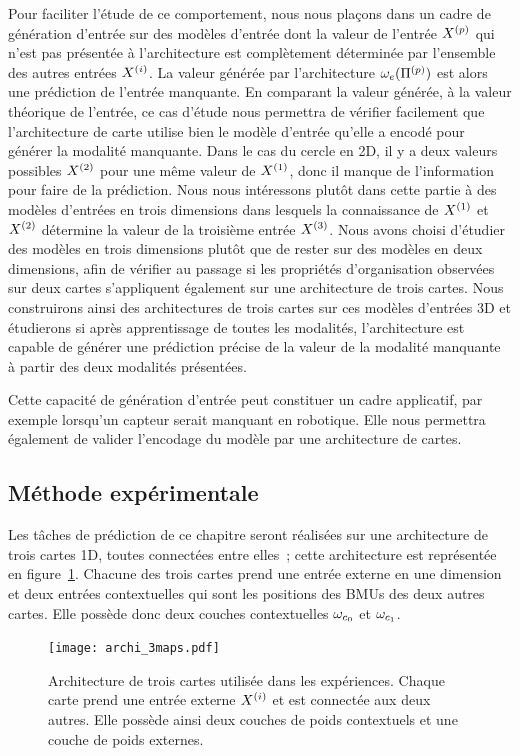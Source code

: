 \documentclass[../main]{subfiles}
\begin{document}
Pour faciliter l'étude de ce comportement, nous nous plaçons dans un cadre de génération d'entrée sur des modèles d'entrée dont la valeur de l'entrée $X^{({p})}$ qui n'est pas présentée à l'architecture est complètement déterminée par l'ensemble des autres entrées $X^{({i})}$. La valeur générée par l'architecture $\omega_e(\Pi^{({p})})$ est alors une prédiction de l'entrée manquante.
En comparant la valeur générée, à la valeur théorique de l'entrée, ce cas d'étude nous permettra de vérifier facilement que l'architecture de carte utilise bien le modèle d'entrée qu'elle a encodé pour générer la modalité manquante.
Dans le cas du cercle en 2D, il y a deux valeurs possibles $X^{({2})}$ pour une même valeur de $X^{({1})}$, donc il manque de l'information pour faire de la prédiction.
Nous nous intéressons plutôt dans cette partie à des modèles d'entrées en trois dimensions dans lesquels la connaissance de $X^{({1})}$ et $X^{({2})}$ détermine la valeur de la troisième entrée $X^{({3})}$.
Nous avons choisi d'étudier des modèles en trois dimensions plutôt que de rester sur des modèles en deux dimensions, afin de vérifier au passage si les propriétés d'organisation observées sur deux cartes s'appliquent également sur une architecture de trois cartes.
Nous construirons ainsi des architectures de trois cartes sur ces modèles d'entrées 3D et étudierons si après apprentissage de toutes les modalités, l'architecture est capable de générer une prédiction précise de la valeur de la modalité manquante à partir des deux modalités présentées.

Cette capacité de génération d'entrée peut constituer un cadre applicatif, par exemple lorsqu'un capteur serait manquant en robotique. Elle nous permettra également de valider l'encodage du modèle par une architecture de cartes.

\subsection{Méthode expérimentale}

Les tâches de prédiction de ce chapitre seront réalisées sur une architecture de trois cartes 1D, toutes connectées entre elles~; cette architecture est représentée en figure~\ref{fig:archi_3maps}.
Chacune des trois cartes prend une entrée externe en une dimension et deux entrées contextuelles qui sont les positions des BMUs des deux autres cartes. Elle possède donc deux couches contextuelles $\omega_{c_0}$ et $\omega_{c_1}$.

\begin{figure}
	\centering\texttt{[image: archi\_3maps.pdf]}
	\caption{Architecture de trois cartes utilisée dans les expériences. Chaque carte prend une entrée externe $X^{({i})}$ et est connectée aux deux autres. Elle possède ainsi deux couches de poids contextuels et une couche de poids externes.\label{fig:archi_3maps}}
\end{figure}
\end{document}
